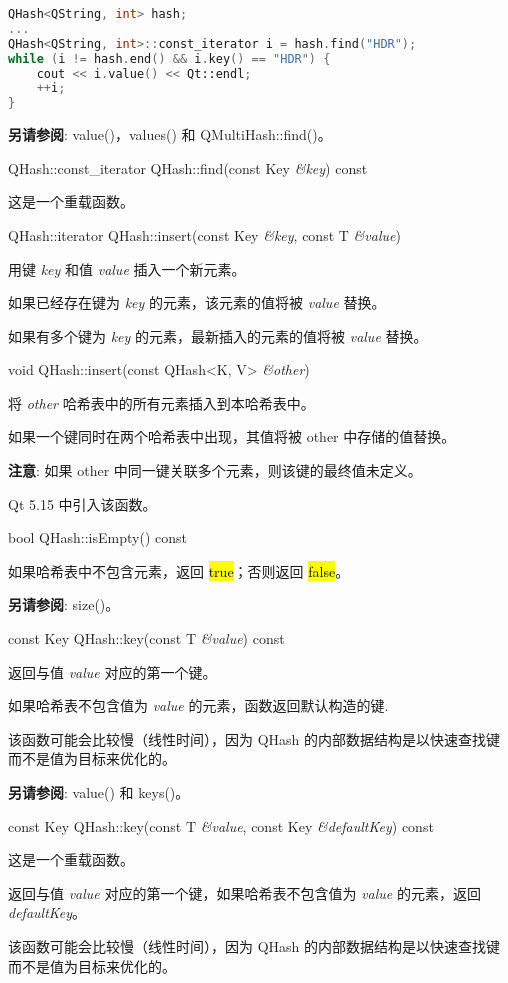\begin{lstlisting}[language=C++]
QHash<QString, int> hash;
...
QHash<QString, int>::const_iterator i = hash.find("HDR");
while (i != hash.end() && i.key() == "HDR") {
    cout << i.value() << Qt::endl;
    ++i;
}
\end{lstlisting}

\textbf{另请参阅}: value()，values() 和 QMultiHash::find()。

QHash::const\_iterator QHash::find(const Key \emph{\&key}) const

这是一个重载函数。

QHash::iterator QHash::insert(const Key \emph{\&key}, const T \emph{\&value})

用键 \emph{key} 和值 \emph{value} 插入一个新元素。

如果已经存在键为 \emph{key} 的元素，该元素的值将被 \emph{value} 替换。

如果有多个键为 \emph{key} 的元素，最新插入的元素的值将被 \emph{value }替换。

void QHash::insert(const QHash<K, V> \emph{\&other})

将 \emph{other} 哈希表中的所有元素插入到本哈希表中。

如果一个键同时在两个哈希表中出现，其值将被 other 中存储的值替换。

\textbf{注意}: 如果 other 中同一键关联多个元素，则该键的最终值未定义。

Qt 5.15 中引入该函数。

bool QHash::isEmpty() const

如果哈希表中不包含元素，返回 \hl{true}；否则返回 \hl{false}。

\textbf{另请参阅}: size()。

const Key QHash::key(const T \emph{\&value}) const

返回与值 \emph{value} 对应的第一个键。

如果哈希表不包含值为 \emph{value} 的元素，函数返回默认构造的键.

该函数可能会比较慢（线性时间），因为 QHash 的内部数据结构是以快速查找键而不是值为目标来优化的。

\textbf{另请参阅}: value() 和 keys()。

const Key QHash::key(const T \emph{\&value}, const Key \emph{\&defaultKey}) const

这是一个重载函数。

返回与值 \emph{value} 对应的第一个键，如果哈希表不包含值为 \emph{value} 的元素，返回 \emph{defaultKey}。

该函数可能会比较慢（线性时间），因为 QHash 的内部数据结构是以快速查找键而不是值为目标来优化的。

